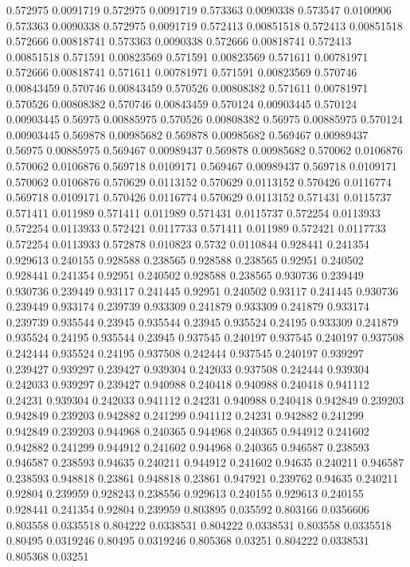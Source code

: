 0.572975 0.0091719
0.572975 0.0091719
0.573363 0.0090338
0.573547 0.0100906
0.573363 0.0090338
0.572975 0.0091719
0.572413 0.00851518
0.572413 0.00851518
0.572666 0.00818741
0.573363 0.0090338
0.572666 0.00818741
0.572413 0.00851518
0.571591 0.00823569
0.571591 0.00823569
0.571611 0.00781971
0.572666 0.00818741
0.571611 0.00781971
0.571591 0.00823569
0.570746 0.00843459
0.570746 0.00843459
0.570526 0.00808382
0.571611 0.00781971
0.570526 0.00808382
0.570746 0.00843459
0.570124 0.00903445
0.570124 0.00903445
0.56975 0.00885975
0.570526 0.00808382
0.56975 0.00885975
0.570124 0.00903445
0.569878 0.00985682
0.569878 0.00985682
0.569467 0.00989437
0.56975 0.00885975
0.569467 0.00989437
0.569878 0.00985682
0.570062 0.0106876
0.570062 0.0106876
0.569718 0.0109171
0.569467 0.00989437
0.569718 0.0109171
0.570062 0.0106876
0.570629 0.0113152
0.570629 0.0113152
0.570426 0.0116774
0.569718 0.0109171
0.570426 0.0116774
0.570629 0.0113152
0.571431 0.0115737
0.571411 0.011989
0.571411 0.011989
0.571431 0.0115737
0.572254 0.0113933
0.572254 0.0113933
0.572421 0.0117733
0.571411 0.011989
0.572421 0.0117733
0.572254 0.0113933
0.572878 0.010823
0.5732 0.0110844
0.928441 0.241354
0.929613 0.240155
0.928588 0.238565
0.928588 0.238565
0.92951 0.240502
0.928441 0.241354
0.92951 0.240502
0.928588 0.238565
0.930736 0.239449
0.930736 0.239449
0.93117 0.241445
0.92951 0.240502
0.93117 0.241445
0.930736 0.239449
0.933174 0.239739
0.933309 0.241879
0.933309 0.241879
0.933174 0.239739
0.935544 0.23945
0.935544 0.23945
0.935524 0.24195
0.933309 0.241879
0.935524 0.24195
0.935544 0.23945
0.937545 0.240197
0.937545 0.240197
0.937508 0.242444
0.935524 0.24195
0.937508 0.242444
0.937545 0.240197
0.939297 0.239427
0.939297 0.239427
0.939304 0.242033
0.937508 0.242444
0.939304 0.242033
0.939297 0.239427
0.940988 0.240418
0.940988 0.240418
0.941112 0.24231
0.939304 0.242033
0.941112 0.24231
0.940988 0.240418
0.942849 0.239203
0.942849 0.239203
0.942882 0.241299
0.941112 0.24231
0.942882 0.241299
0.942849 0.239203
0.944968 0.240365
0.944968 0.240365
0.944912 0.241602
0.942882 0.241299
0.944912 0.241602
0.944968 0.240365
0.946587 0.238593
0.946587 0.238593
0.94635 0.240211
0.944912 0.241602
0.94635 0.240211
0.946587 0.238593
0.948818 0.23861
0.948818 0.23861
0.947921 0.239762
0.94635 0.240211
0.92804 0.239959
0.928243 0.238556
0.929613 0.240155
0.929613 0.240155
0.928441 0.241354
0.92804 0.239959
0.803895 0.035592
0.803166 0.0356606
0.803558 0.0335518
0.804222 0.0338531
0.804222 0.0338531
0.803558 0.0335518
0.80495 0.0319246
0.80495 0.0319246
0.805368 0.03251
0.804222 0.0338531
0.805368 0.03251
